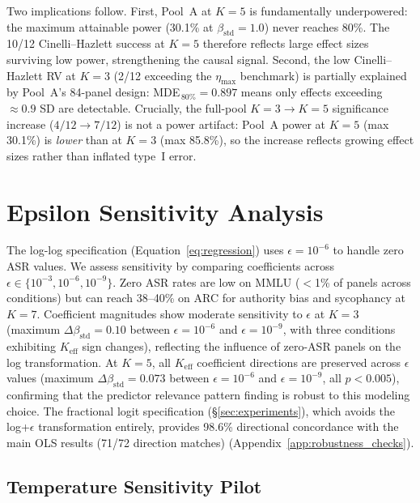 Two implications follow. First, Pool~A at $K{=}5$ is fundamentally underpowered: the maximum attainable power (30.1\% at $\beta_{\mathrm{std}}{=}1.0$) never reaches 80\%. The 10/12 Cinelli--Hazlett success at $K{=}5$ therefore reflects large effect sizes surviving low power, strengthening the causal signal. Second, the low Cinelli--Hazlett RV at $K{=}3$ (2/12 exceeding the $\eta_{\max}$ benchmark) is partially explained by Pool~A's 84-panel design: MDE$_{\,80\%}{=}0.897$ means only effects exceeding ${\approx}0.9$ SD are detectable. Crucially, the full-pool $K{=}3 \to K{=}5$ significance increase ($4/12 \to 7/12$) is not a power artifact: Pool~A power at $K{=}5$ (max 30.1\%) is \emph{lower} than at $K{=}3$ (max 85.8\%), so the increase reflects growing effect sizes rather than inflated type~I error.

\FloatBarrier
\section{Epsilon Sensitivity Analysis}
\label{app:epsilon}

The log-log specification (Equation~\ref{eq:regression}) uses $\epsilon{=}10^{-6}$ to handle zero ASR values. We assess sensitivity by comparing coefficients across $\epsilon \in \{10^{-3}, 10^{-6}, 10^{-9}\}$. Zero ASR rates are low on MMLU ($<$1\% of panels across conditions) but can reach 38--40\% on ARC for authority bias and sycophancy at $K{=}7$. Coefficient magnitudes show moderate sensitivity to $\epsilon$ at $K{=}3$ (maximum $\Delta\beta_{\mathrm{std}} = 0.10$ between $\epsilon{=}10^{-6}$ and $\epsilon{=}10^{-9}$, with three conditions exhibiting $K_{\mathrm{eff}}$ sign changes), reflecting the influence of zero-ASR panels on the log transformation. At $K{=}5$, all $K_{\mathrm{eff}}$ coefficient directions are preserved across $\epsilon$ values (maximum $\Delta\beta_{\mathrm{std}} = 0.073$ between $\epsilon{=}10^{-6}$ and $\epsilon{=}10^{-9}$, all $p < 0.005$), confirming that the predictor relevance pattern finding is robust to this modeling choice. The fractional logit specification (\S\ref{sec:experiments}), which avoids the log+$\epsilon$ transformation entirely, provides 98.6\% directional concordance with the main OLS results (71/72 direction matches) (Appendix~\ref{app:robustness_checks}).

\subsection{Temperature Sensitivity Pilot}
\label{app:temperature}

